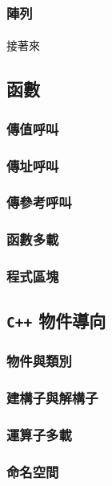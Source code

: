 \documentclass[12pt,a4paper,oneside]{article}
\begin{document}
\begin{CJK}{UTF8}{bkai}
\subsubsection{陣列}

\paragraph{}接著來

\subsection{函數}
\subsubsection{傳值呼叫}
\subsubsection{傳址呼叫}
\subsubsection{傳參考呼叫}
\subsubsection{函數多載}
\subsubsection{程式區塊}



\subsection{\texttt{C++} 物件導向}
\subsubsection{物件與類別}
\subsubsection{建構子與解構子}
\subsubsection{運算子多載}

\subsubsection{命名空間}


\end{CJK}
\end{document}
